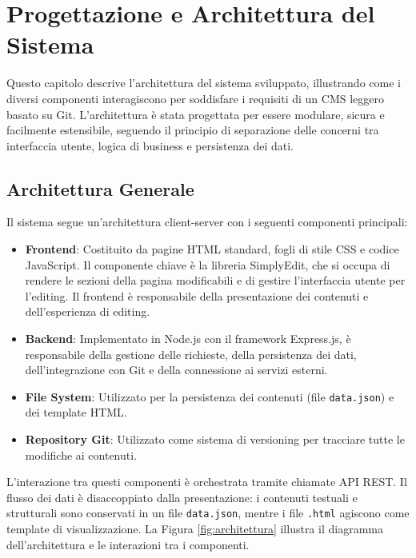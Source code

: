 \chapter{Progettazione e Architettura del Sistema}
\label{chap:architettura}

Questo capitolo descrive l'architettura del sistema sviluppato, illustrando come i diversi componenti interagiscono per soddisfare i requisiti di un CMS leggero basato su Git. L'architettura è stata progettata per essere modulare, sicura e facilmente estensibile, seguendo il principio di separazione delle concerni tra interfaccia utente, logica di business e persistenza dei dati.

\section{Architettura Generale}
Il sistema segue un'architettura client-server con i seguenti componenti principali:

\begin{itemize}
    \item \textbf{Frontend}: Costituito da pagine HTML standard, fogli di stile CSS e codice JavaScript. Il componente chiave è la libreria SimplyEdit, che si occupa di rendere le sezioni della pagina modificabili e di gestire l'interfaccia utente per l'editing. Il frontend è responsabile della presentazione dei contenuti e dell'esperienza di editing.
    
    \item \textbf{Backend}: Implementato in Node.js con il framework Express.js, è responsabile della gestione delle richieste, della persistenza dei dati, dell'integrazione con Git e della connessione ai servizi esterni.
    
    \item \textbf{File System}: Utilizzato per la persistenza dei contenuti (file \texttt{data.json}) e dei template HTML.
    
    \item \textbf{Repository Git}: Utilizzato come sistema di versioning per tracciare tutte le modifiche ai contenuti.
\end{itemize}

L'interazione tra questi componenti è orchestrata tramite chiamate API REST. Il flusso dei dati è disaccoppiato dalla presentazione: i contenuti testuali e strutturali sono conservati in un file \texttt{data.json}, mentre i file \texttt{.html} agiscono come template di visualizzazione. La Figura \ref{fig:architettura} illustra il diagramma dell'architettura e le interazioni tra i componenti.

